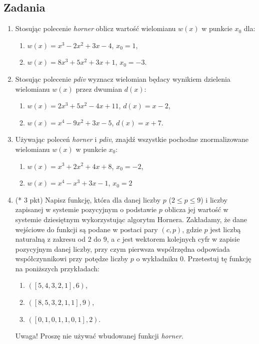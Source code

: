 \documentclass[10pt,a4paper]{article}
\begin{document}
\subsection*{Zadania}

\begin{enumerate}
 \item Stosując polecenie \emph{horner} oblicz wartość wielomianu $w(x)$ w punkcie $x_0$ dla:
	\begin{enumerate}
		\item $w(x)=x^3-2x^2+3x-4$, $x_0=1$,
		\item $w(x)=8x^3+5x^2+3x+1$, $x_0=-3$.
	\end{enumerate}

\item  Stosując polecenie \emph{pdiv} wyznacz wielomian będacy wynikiem dzielenia wielomianu $w(x)$ przez dwumian $d(x)$:
\begin{enumerate}
	\item $w(x)=2x^3+5x^2-4x+11$, $d(x)=x-2$,
	\item $w(x)=x^4-9x^2+3x-5$, $d(x)=x+7$.
\end{enumerate}

\item Używając poleceń \emph{horner} i \emph{pdiv}, znajdź wszystkie pochodne znormalizowane  wielomianu $w(x)$ w punkcie $x_0$:
\begin{enumerate}
	\item $w(x)=x^3+2x^2+4x+8$, $x_0=-2$,
	\item $w(x)=x^4-x^3+3x-1$, $x_0=2$
\end{enumerate}


\item (* 3 pkt) Napisz funkcję, która dla danej liczby $p$ ($2\leq p \leq 9$) i liczby zapisanej w systemie pozycyjnym o podstawie $p$ oblicza jej wartość w systemie dziesiętnym wykorzystując algorytm Hornera.  Zakładamy, że dane wejściowe do funkcji są podane w postaci pary $(c,p)$, gdzie $p$ jest liczbą naturalną z zakresu od $2$ do $9$, a $c$ jest wektorem kolejnych cyfr w zapisie pozycyjnym danej liczby, przy czym pierwsza współrzędna odpowiada współczynnikowi przy potędze liczby $p$ o wykładniku $0$.  Przetestuj tę funkcję na poniższych przykładach:
\begin{enumerate}
	\item $([5,4,3,2,1],6)$,
	\item $([8,5,3,2,1,1],9)$,
	\item $([0,1,0,1,1,0,1],2)$.
\end{enumerate}
Uwaga! Proszę nie używać wbudowanej funkcji \emph{horner}.


\end{enumerate}
\end{document}
